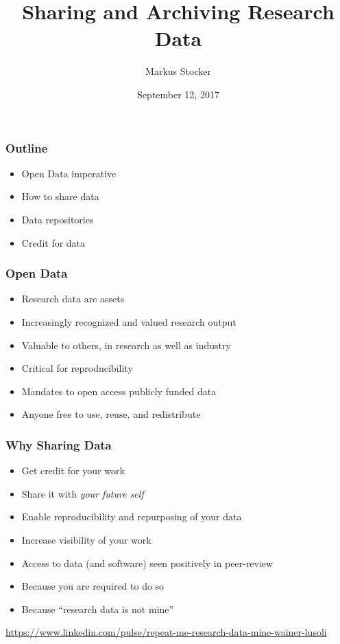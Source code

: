 \documentclass{beamer}
\title{Sharing and Archiving Research Data}
\author{Markus Stocker}
\date{September 12, 2017}
\begin{document}
\maketitle

\begin{frame}
  \frametitle{Outline}
  
  \begin{itemize}
  \item Open Data imperative
  \item How to share data
  \item Data repositories
  \item Credit for data
  \end{itemize}
\end{frame}

\begin{frame}
  \frametitle{Open Data}
  
  \begin{itemize}
  \item Research data are assets
  \item Increasingly recognized and valued research output	
  \item Valuable to others, in research as well as industry
  \item Critical for reproducibility
  \item Mandates to open access publicly funded data
  \item Anyone free to use, reuse, and redistribute
  \end{itemize}
\end{frame}

\begin{frame}
  \frametitle{Why Sharing Data}
  
  \begin{itemize}
  \item Get credit for your work
  \item Share it with \emph{your future self}
  \item Enable reproducibility and repurposing of your data
  \item Increase visibility of your work
  \item Access to data (and software) seen positively in peer-review
  \item Because you are required to do so
  \item Because ``research data is not mine''
  \end{itemize}
  \tiny
  \begin{flushright}
  \url{https://www.linkedin.com/pulse/repeat-me-research-data-mine-wainer-lusoli}
  \end{flushright}
\end{frame}
\end{document}
